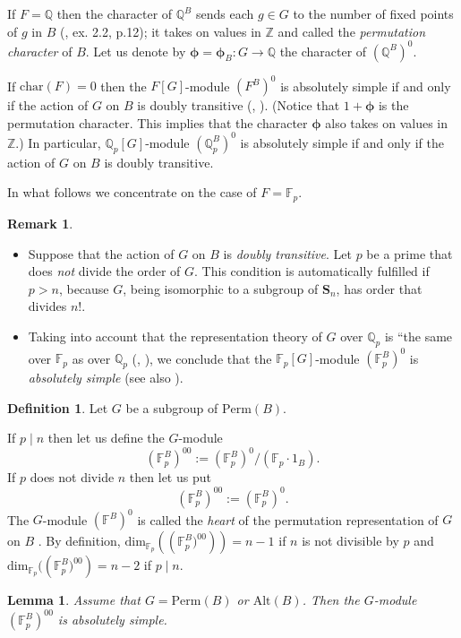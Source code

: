 \documentclass[12pt,a4paper,reqno]{amsart}
\def\Q{{\mathbb Q}}
\def\Z{{\mathbb Z}}
\def\F{{\mathbb F}}
\def\bphi{{\mathbf \phi}}
\def\Perm{\mathrm{Perm}}
\def\Alt{\mathrm{Alt}}
\def\fchar{\mathrm{char}}
\def\dim{\mathrm{dim}}
\newtheorem{lem}[thm]{Lemma}
\theoremstyle{definition}
\newtheorem{defn}[thm]{Definition}
\newtheorem{rem}[thm]{Remark}
\begin{document}
If $F=\Q$ then
 the character of $\Q^B$ sends each $g \in G$ to the number of fixed points of $g$ in $B$ (\cite{SerreRep}, ex. 2.2, p.12); it takes on values in $\Z$ and called the
 {\sl permutation character} of $B$. Let us denote by
$\bphi=\bphi_B:G \to \Q$
 the character of $(\Q^B)^0$.

If $\fchar(F)=0$ then the  $F[G]$-module $(F^B)^0$ is absolutely simple if and only if the action of  $G$ on $B$  is doubly transitive (\cite[ex. 2.6, p. 17]{SerreRep}, \cite{Mortimer}).
(Notice that $1+\bphi$ is the permutation character. This implies that the character $\bphi$ also takes on values in $\Z$.) In particular,   $\Q_p[G]$-module $(\Q_p^B)^0$ is absolutely simple if and only if the action of  $G$ on $B$  is doubly transitive.

In what follows we concentrate on the case of $F=\F_p$.

\begin{rem}
\label{DoubleprimeToP}
\begin{itemize}
\item
Suppose that the action of  $G$ on $B$  is {\sl doubly transitive}. 
Let $p$ be a prime that does {\sl not} divide the order of $G$. This condition is automatically fulfilled if $p>n$, because $G$, being isomorphic to a subgroup of $\mathbf{S}_n$, has order that divides $n!$.  
\item
Taking into account that the representation theory  of $G$ over $\Q_p$ is ``the same over $\F_p$ as over $\Q_p$ (\cite[Sect. 15.5, Prop.43]{SerreRep}, \cite{Mortimer}), we conclude that the
$\F_p[G]$-module $(\F_p^B)^0$ is {\sl absolutely simple} (see also \cite[Cor. 7.5 on p. 513]{ZarhinGanita}).
\end{itemize}
\end{rem}

\begin{defn}
\label{heartDef}
Let $G$ be a subgroup of $\Perm(B)$.

If  $p\mid n$  then let us define the $G$-module
$$\left(\F_p^B\right)^{00}:=(\F_p^B)^0/(\F_p \cdot 1_B).$$
If $p$ does not divide $n$ then let us put
$$\left(\F_p^B\right)^{00} := (\F_p^B)^0.$$
The $G$-module $(\F^B)^0$
is called the {\sl heart} of the permutation  representation of $G$ on $B$ \cite{Mortimer}.
By definition,
$\dim_{\F_p}(\left(\F_p^B)^{00}\right))=n-1$ if $n$ is not divisible by $p$
 and $\dim_{\F_p}(\left(\F_p^B)^{00}\right)=n-2$ if $p\mid n$.
\end{defn}

\begin{lem}
\label{Anp}
Assume that $G=\Perm(B)$ or $\Alt(B)$.
Then the $G$-module $\left(\F_p^{B}\right)^{00}$ is absolutely simple.
\end{lem}
\end{document}
